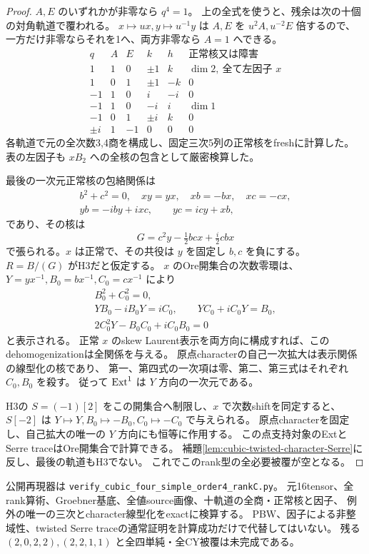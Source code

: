 \begin{proof}
$A,E$ のいずれかが非零なら $q^4=1$。
上の全式を使うと、残余は次の十個の対角軌道で覆われる。
$x\mapsto ux,y\mapsto u^{-1}y$ は $A,E$ を $u^2A,u^{-2}E$ 倍するので、
一方だけ非零ならそれを1へ、両方非零なら $A=1$ へできる。
\[
\begin{array}{c|c|c|c|c|c}
 q&A&E&k&h&\text{正常核又は障害}\\\hline
 1&1&0&\pm1&k&\dim2,\ \text{全て左因子 }x\\
 1&0&1&\pm1&-k&0\\
 -1&1&0&i&-i&0\\
 -1&1&0&-i&i&\dim1\\
 -1&0&1&\pm i&k&0\\
 \pm i&1&-1&0&0&0
\end{array}
\]
各軌道で元の全次数3,4商を構成し、固定三次5列の正常核をfreshに計算した。
表の左因子も $xB_2$ への全核の包含として厳密検算した。

最後の一次元正常核の包絡関係は
\begin{gather*}
 b^2+c^2=0,\quad xy=yx,\quad xb=-bx,\quad xc=-cx,\\
 yb=-iby+ixc,\qquad yc=icy+xb,
\end{gather*}
であり、その核は
\[
 G=c^2y-\tfrac12bcx+\tfrac i2cbx
\]
で張られる。$x$ は正常で、その共役は $y$ を固定し $b,c$ を負にする。
$R=B/(G)$ がH3だと仮定する。
$x$ のOre開集合の次数零環は、$Y=yx^{-1},B_0=bx^{-1},C_0=cx^{-1}$ により
\begin{gather*}
 B_0^2+C_0^2=0,\\
 YB_0-iB_0Y=iC_0,\qquad YC_0+iC_0Y=B_0,\\
 2C_0^2Y-B_0C_0+iC_0B_0=0
\end{gather*}
と表示される。
正常 $x$ のskew Laurent表示を両方向に構成すれば、このdehomogenizationは全関係を与える。
原点characterの自己一次拡大は表示関係の線型化の核であり、
第一、第四式の一次項は零、第二、第三式はそれぞれ $C_0,B_0$ を殺す。
従って $\operatorname{Ext}^1$ は $Y$ 方向の一次元である。

H3の $S=(-1)[2]$ をこの開集合へ制限し、$x$ で次数shiftを同定すると、
$S[-2]$ は $Y\mapsto Y,B_0\mapsto-B_0,C_0\mapsto-C_0$ で与えられる。
原点characterを固定し、自己拡大の唯一の $Y$ 方向にも恒等に作用する。
この点支持対象のExtとSerre traceはOre開集合で計算できる。
補題\ref{lem:cubic-twisted-character-Serre}に反し、最後の軌道もH3でない。
これでこのrank型の全必要被覆が空となる。
\end{proof}

公開再現器は \texttt{verify\_cubic\_four\_simple\_order4\_rankC.py}。
元16tensor、全rank算術、Groebner基底、全値source画像、十軌道の全商・正常核と因子、
例外の唯一の三次とcharacter線型化をexactに検算する。
PBW、因子による非整域性、twisted Serre traceの通常証明を計算成功だけで代替してはいない。
残る $(2,0,2,2),(2,2,1,1)$ と全四単純・全CY被覆は未完成である。
